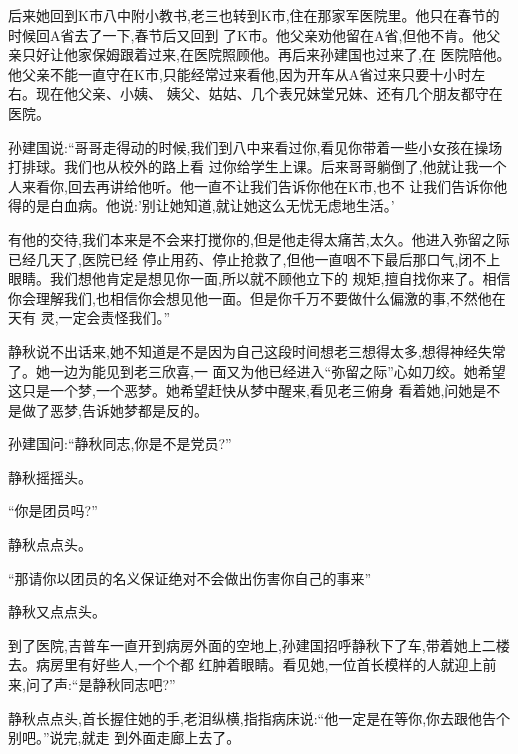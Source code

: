 ﻿\documentclass[12pt]{article}
\begin{document}
后来她回到K市八中附小教书,老三也转到K市,住在那家军医院里。他只在春节的时候回A省去了一下,春节后又回到
了K市。他父亲劝他留在A省,但他不肯。他父亲只好让他家保姆跟着过来,在医院照顾他。再后来孙建国也过来了,在
医院陪他。他父亲不能一直守在K市,只能经常过来看他,因为开车从A省过来只要十小时左右。现在他父亲、小姨、
姨父、姑姑、几个表兄妹堂兄妹、还有几个朋友都守在医院。



孙建国说:``哥哥走得动的时候,我们到八中来看过你,看见你带着一些小女孩在操场打排球。我们也从校外的路上看
过你给学生上课。后来哥哥躺倒了,他就让我一个人来看你,回去再讲给他听。他一直不让我们告诉你他在K市,也不
让我们告诉你他得的是白血病。他说:'别让她知道,就让她这么无忧无虑地生活。'



有他的交待,我们本来是不会来打搅你的,但是他走得太\myrule 痛苦,太久。他进入弥留之际已经几天了,医院已经
停止用药、停止抢救了,但他一直咽不下最后那口气,闭不上眼睛。我们想他肯定是想见你一面,所以就不顾他立下的
规矩,擅自找你来了。相信你会理解我们,也相信你会想见他一面。但是你千万不要做什么偏激的事,不然他在天有
灵,一定会责怪我们。''



静秋说不出话来,她不知道是不是因为自己这段时间想老三想得太多,想得神经失常了。她一边为能见到老三欣喜,一
面又为他已经进入``弥留之际''心如刀绞。她希望这只是一个梦,一个恶梦。她希望赶快从梦中醒来,看见老三俯身
看着她,问她是不是做了恶梦,告诉她梦都是反的。



孙建国问:``静秋同志,你是不是党员?''



静秋摇摇头。



``你是团员吗?''



静秋点点头。



``那请你以团员的名义保证绝对不会做出伤害你自己的事来\myrule ''



静秋又点点头。



到了医院,吉普车一直开到病房外面的空地上,孙建国招呼静秋下了车,带着她上二楼去。病房里有好些人,一个个都
红肿着眼睛。看见她,一位首长模样的人就迎上前来,问了声:``是静秋同志吧?''



静秋点点头,首长握住她的手,老泪纵横,指指病床说:``他一定是在等你,你去\myrule 跟他告个别吧。''说完,就走
到外面走廊上去了。
\end{document}
